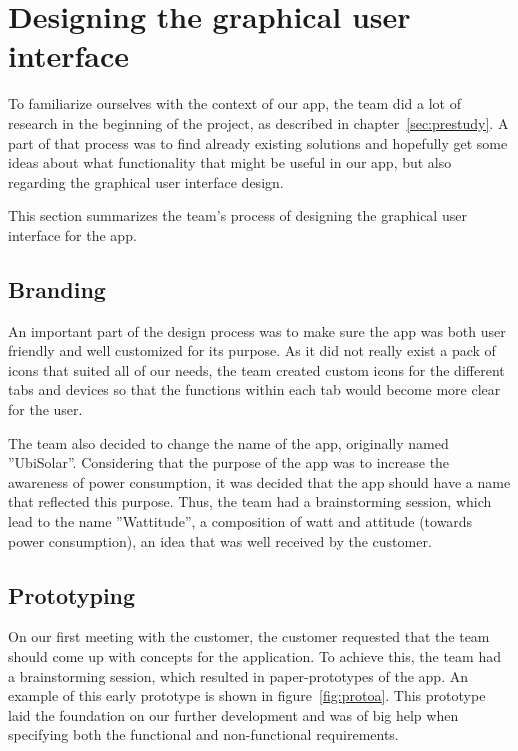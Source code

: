 \section{Designing the graphical user interface}
To familiarize ourselves with the context of our app, the team did a lot of research in the beginning of the project, as described in chapter~\ref{sec:prestudy}. A part of that process was to find already existing solutions and hopefully get some ideas about what functionality that might be useful in our app, but also regarding the graphical user interface design.

This section summarizes the team's process of designing the graphical user interface for the app.

\subsection{Branding}
An important part of the design process was to make sure the app was both user friendly and well customized for its purpose. As it did not really exist a pack of icons that suited all of our needs, the team created custom icons for the different tabs and devices so that the functions within each tab would become more clear for the user.

The team also decided to change the name of the app, originally named ''UbiSolar''. Considering that the purpose of the app was to increase the awareness of power consumption, it was decided that the app should have a name that reflected this purpose. Thus, the team had a brainstorming session, which lead to the name ''Wattitude'', a composition of watt and attitude (towards power consumption), an idea that was well received by the customer.



\subsection{Prototyping}
On our first meeting with the customer, the customer requested that the team should come up with concepts for the application. To achieve this, the team had a brainstorming session, which resulted in paper-prototypes of the app. An example of this early prototype is shown in figure~\ref{fig:protoa}. This prototype laid the foundation on our further development and was of big help when specifying both the functional and non-functional requirements.

